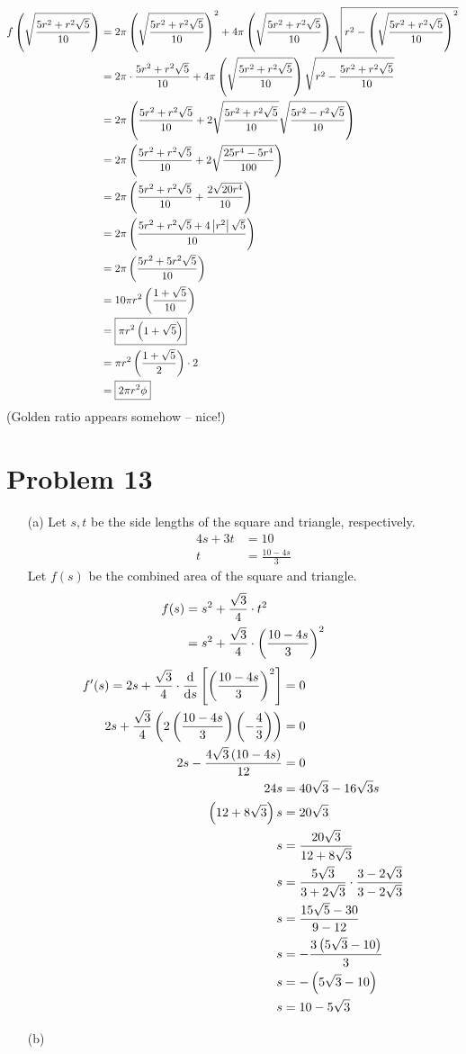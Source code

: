 \documentclass{article}
\newcommand*{\paren}[1]{\ensuremath\left(#1\right)}
\newcommand*{\problem}[1]{\section*{Problem #1}}
\newcommand*{\Deriv}[2][x]{\ensuremath{\dfrac{\mathrm{d}}{\mathrm{d}#1}\left[#2\right]}}
\newcommand*{\abs}[1]{\ensuremath{\left|#1\right|}}
\begin{document}
\begin{align*}
	f\paren{\sqrt{\frac{5r^2+r^2\sqrt{5}}{10}}}
	&=2\pi\paren{\sqrt{\frac{5r^2+r^2\sqrt{5}}{10}}}^2+4\pi\paren{\sqrt{\frac{5r^2+r^2\sqrt{5}}{10}}}\sqrt{r^2-\paren{\sqrt{\frac{5r^2+r^2\sqrt{5}}{10}}}^2} \\
	&=2\pi\cdot\frac{5r^2+r^2\sqrt{5}}{10}+4\pi\paren{\sqrt{\frac{5r^2+r^2\sqrt{5}}{10}}}\sqrt{r^2-\frac{5r^2+r^2\sqrt{5}}{10}} \\
	&=2\pi\paren{\frac{5r^2+r^2\sqrt{5}}{10}+2\sqrt{\frac{5r^2+r^2\sqrt{5}}{10}}\sqrt{\frac{5r^2-r^2\sqrt{5}}{10}}} \\
	&=2\pi\paren{\frac{5r^2+r^2\sqrt{5}}{10}+2\sqrt{\frac{25r^4-5r^4}{100}}} \\
	&=2\pi\paren{\frac{5r^2+r^2\sqrt{5}}{10}+\frac{2\sqrt{20r^4}}{10}} \\
	&=2\pi\paren{\frac{5r^2+r^2\sqrt{5}+4\abs{r^2}\sqrt{5}}{10}} \\
	&=2\pi\paren{\frac{5r^2+5r^2\sqrt{5}}{10}} \\
	&=10\pi r^2\paren{\frac{1+\sqrt{5}}{10}} \\
	&=\boxed{\pi r^2\paren{1+\sqrt{5}}} \\
	&=\pi r^2\paren{\frac{1+\sqrt{5}}{2}}\cdot2 \\
	&=\boxed{2\pi r^2\phi}
\end{align*}
(Golden ratio appears somehow -- nice!)

\problem{13}
\begin{itemize}
	\item[(a)]
	Let $s,t$ be the side lengths of the square and triangle, respectively.
	\begin{align*}
		4s+3t&=10 \\
		t&=\frac{10-4s}{3}
	\end{align*}
	Let $f(s)$ be the combined area of the square and triangle.
	\begin{align*}
		f(s)&=s^2+\frac{\sqrt3}{4}\cdot t^2 \\
		&=s^2+\frac{\sqrt3}{4}\cdot\paren{\frac{10-4s}{3}}^2
	\end{align*}
	\begin{align*}
		f'(s)=2s+\frac{\sqrt3}{4}\cdot\Deriv[s]{\paren{\frac{10-4s}{3}}^2}&=0 \\
		2s+\frac{\sqrt3}{4}\paren{2\paren{\frac{10-4s}{3}}\paren{-\frac43}}&=0 \\
		2s-\frac{4\sqrt3\paren{10-4s}}{12}&=0 \\
		24s&=40\sqrt{3}-16\sqrt{3}s \\
		\paren{12+8\sqrt{3}}s&=20\sqrt{3} \\
		s&=\frac{20\sqrt3}{12+8\sqrt3} \\
		s&=\frac{5\sqrt3}{3+2\sqrt3}\cdot\frac{3-2\sqrt3}{3-2\sqrt3} \\
		s&=\frac{15\sqrt{5}-30}{9-12} \\
		s&=-\frac{3\paren{5\sqrt3-10}}{3} \\
		s&=-\paren{5\sqrt3-10} \\
		s&=10-5\sqrt3
	\end{align*}

	\item[(b)]
\end{itemize}
\end{document}
